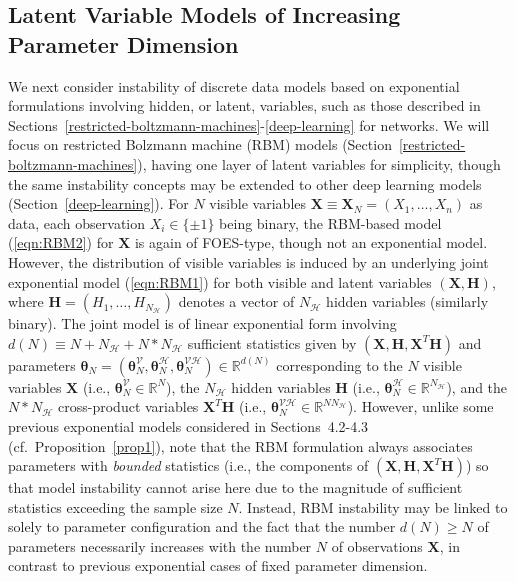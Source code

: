 \documentclass[12pt]{article}
\theoremstyle{definition}
\begin{document}
   \subsection{Latent Variable Models of Increasing Parameter Dimension}  We next consider instability of discrete data models  based on exponential  formulations involving hidden, or latent, variables, such as those described in Sections~\ref{restricted-boltzmann-machines}-\ref{deep-learning} for networks.  We will focus on restricted Bolzmann machine (RBM) models
(Section~\ref{restricted-boltzmann-machines}), having one layer of latent variables for simplicity,  though the same  instability concepts may be extended to other deep learning models  (Section~\ref{deep-learning}).
For $N$ visible variables $\boldsymbol X \equiv \boldsymbol X_N = (X_1,\ldots,X_n)$ as data,  each observation $X_i\in\{\pm 1\}$ being binary,
the RBM-based model (\ref{eqn:RBM2}) for  $\boldsymbol X$ is again of FOES-type, though not an exponential model.  However, the distribution of
visible variables is induced by an underlying joint exponential model  (\ref{eqn:RBM1})  for both visible and latent variables $(\boldsymbol X, \boldsymbol H)$, where $\boldsymbol H=(H_1,\ldots,H_{N_{\mathcal{H}}})$ denotes a vector of $N_{\mathcal{H}}$ hidden variables (similarly binary).
 The joint model is of linear exponential form involving $d(N)\equiv N + N_{\mathcal{H}} + N* N_{\mathcal{H}}$ sufficient statistics given by $(\boldsymbol X, \boldsymbol H, \boldsymbol X^T\boldsymbol H)$ and parameters $\boldsymbol \theta_N = (\boldsymbol \theta_N^{\mathcal{V}},\boldsymbol \theta_N^{\mathcal{H}}, \boldsymbol \theta_N^{\mathcal{VH}}  ) \in\mathbb{R}^{d(N)}$ corresponding to
 the $N$ visible variables $\boldsymbol X$ (i.e., $\boldsymbol \theta_N^{\mathcal{V}}\in\mathbb{R}^N$), the $N_{\mathcal{H}}$ hidden variables $\boldsymbol H$ (i.e., $\boldsymbol \theta_N^{\mathcal{H}}\in\mathbb{R}^{N_{\mathcal{H}}}$), and the $N *N_{\mathcal{H}}$ cross-product variables $\boldsymbol X^T\boldsymbol H$ (i.e., $\boldsymbol \theta_N^{\mathcal{VH}}\in\mathbb{R}^{N N_{\mathcal{H}}}$).  However, unlike some previous exponential models considered in Sections~4.2-4.3 (cf.~Proposition~\ref{prop1}), note that the RBM formulation always associates parameters with {\it bounded} statistics  (i.e., the components of $(\boldsymbol X, \boldsymbol H, \boldsymbol X^T\boldsymbol H)$) so that  model instability cannot arise here
 due to the magnitude of sufficient statistics exceeding the sample size $N$.        Instead, RBM instability  may be linked to solely to parameter configuration and the fact that the number $d(N) \geq N$ of parameters necessarily increases with the number $N$ of observations $\boldsymbol X$,
 in contrast to previous exponential cases of fixed parameter dimension.
\end{document}
